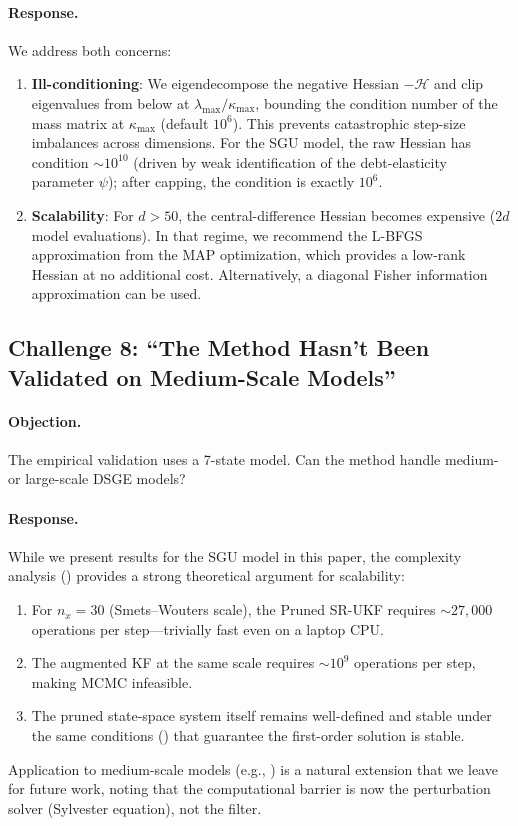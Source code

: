 \documentclass[12pt,a4paper]{article}
\begin{document}
\paragraph{Response.}
We address both concerns:
\begin{enumerate}[nosep]
\item \textbf{Ill-conditioning}: We eigendecompose the negative
Hessian $-\mathcal{H}$ and clip eigenvalues from below at
$\lambda_{\max} / \kappa_{\max}$, bounding the condition number of
the mass matrix at $\kappa_{\max}$ (default $10^6$). This prevents
catastrophic step-size imbalances across dimensions. For the SGU
model, the raw Hessian has condition $\sim 10^{10}$ (driven by weak
identification of the debt-elasticity parameter $\psi$); after
capping, the condition is exactly $10^6$.
\item \textbf{Scalability}: For $d > 50$, the central-difference
Hessian becomes expensive ($2d$ model evaluations). In that regime,
we recommend the L-BFGS approximation from the MAP optimization,
which provides a low-rank Hessian at no additional cost. Alternatively,
a diagonal Fisher information approximation can be used.
\end{enumerate}

\subsection{Challenge 8: ``The Method Hasn't Been Validated on Medium-Scale Models''}
\label{sec:challenge-medium}

\paragraph{Objection.}
The empirical validation uses a 7-state model. Can the method handle
medium- or large-scale DSGE models?

\paragraph{Response.}
While we present results for the SGU model in this paper, the
complexity analysis () provides a strong theoretical
argument for scalability:
\begin{enumerate}[nosep]
\item For $n_x = 30$ (Smets--Wouters scale), the Pruned SR-UKF
requires $\sim 27{,}000$ operations per step---trivially fast even
on a laptop CPU.
\item The augmented KF at the same scale requires $\sim 10^9$
operations per step, making MCMC infeasible.
\item The pruned state-space system itself remains well-defined
and stable under the same conditions () that
guarantee the first-order solution is stable.
\end{enumerate}
Application to medium-scale models (e.g., \citealt{smets2007shocks})
is a natural extension that we leave for future work, noting that the
computational barrier is now the perturbation solver (Sylvester
equation), not the filter.
\end{document}
